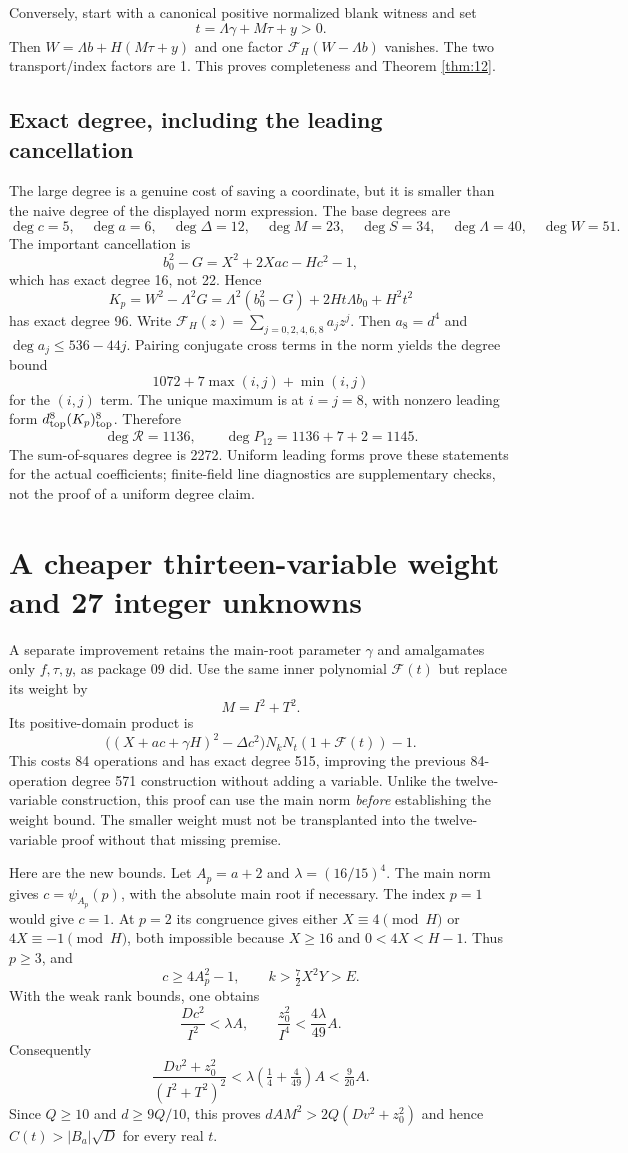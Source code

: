 \documentclass[11 pt]{article}
\begin{document}
Conversely, start with a canonical positive normalized blank witness and set
\[
t=\Lambda\gamma+M\tau+y>0.
\]
Then $ W=\Lambda b+H(M\tau+y)$ and one factor $\mathcal F_H(W-\Lambda b)$ vanishes. The two transport/index factors are 1. This proves completeness and Theorem \ref{thm:12}.
\subsection{Exact degree, including the leading cancellation}
The large degree is a genuine cost of saving a coordinate, but it is smaller than the naive degree of the displayed norm expression. The base degrees are
\[
\deg c=5,\quad\deg a=6,\quad\deg\Delta=12,\quad
\deg M=23,\quad\deg S=34,\quad\deg\Lambda=40,\quad\deg W=51.
\]
The important cancellation is
\[
b_0^2-G=X^2+2 Xac-Hc^2-1,
\]
which has exact degree 16, not 22. Hence
\[
K_p=W^2-\Lambda^2 G
=\Lambda^2(b_0^2-G)+2 Ht\Lambda b_0+H^2 t^2
\]
has exact degree 96.
Write $\mathcal F_H(z)=\sum_{j=0,2,4,6,8} a_jz^j $. Then
$ a_8=d^4 $ and $\deg a_j\le 536-44 j $. Pairing conjugate cross terms in the norm yields the degree bound
\[
1072+7\max(i,j)+\min(i,j)
\]
for the $(i,j)$ term. The unique maximum is at $ i=j=8 $, with nonzero leading form $ d_{\rm top}^8(K_p)_{\rm top}^8 $. Therefore
\[
\deg\mathcal R=1136,\qquad\deg P_{12}=1136+7+2=1145.
\]
The sum-of-squares degree is 2272. Uniform leading forms prove these statements for the actual coefficients; finite-field line diagnostics are supplementary checks, not the proof of a uniform degree claim.

\section{A cheaper thirteen-variable weight and 27 integer unknowns}
A separate improvement retains the main-root parameter $\gamma $ and amalgamates only $ f,\tau,y $, as package 09 did. Use the same inner polynomial $\mathcal F(t)$ but replace its weight by
\[
\boxed{M=I^2+T^2.}
\]
Its positive-domain product is
\[
\bigl((X+ac+\gamma H)^2-\Delta c^2\bigr)
N_kN_t(1+\mathcal F(t))-1.
\]
This costs 84 operations and has exact degree 515, improving the previous 84-operation degree 571 construction without adding a variable. Unlike the twelve-variable construction, this proof can use the main norm \emph{before} establishing the weight bound. The smaller weight must not be transplanted into the twelve-variable proof without that missing premise.

Here are the new bounds. Let $ A_p=a+2 $ and $\lambda=(16/15)^4 $. The main norm gives $ c=\psi_{A_p}(p)$, with the absolute main root if necessary. The index $ p=1 $ would give $ c=1 $. At $ p=2 $ its congruence gives either $ X\equiv 4\pmod H $ or $ 4 X\equiv-1\pmod H $, both impossible because $ X\ge 16 $ and $ 0<4 X<H-1 $. Thus $ p\ge 3 $, and
\[
c\ge 4 A_p^2-1,\qquad k>\tfrac 72 X^2 Y>E.
\]
With the weak rank bounds, one obtains
\[
\frac{Dc^2}{I^2}<\lambda A,\qquad
\frac{z_0^2}{I^4}<\frac{4\lambda}{49}A.
\]
Consequently
\[
\frac{Dv^2+z_0^2}{(I^2+T^2)^2}
<\lambda\left(\tfrac 14+\tfrac 4{49}\right)A<\tfrac 9{20}A.
\]
Since $ Q\ge 10 $ and $ d\ge 9 Q/10 $, this proves
$ dAM^2>2 Q(Dv^2+z_0^2)$ and hence
$ C(t)>|B_a|\sqrt D $ for every real $ t $.
\end{document}
